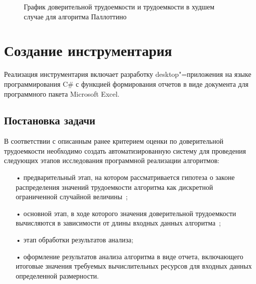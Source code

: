 \documentclass[a4paper, article, 14pt]{extarticle}
\begin{document}
\begin{figure}[h]
	\caption{График доверительной трудоемкости и трудоемкости в худшем случае для алгоритма Паллоттино}
	\label{fig:comparison_complexities}
\end{figure}

\section{Создание инструментария}\label{sec:analysis_system}

Реализация инструментария включает разработку desktop"=приложения на языке программирования C\# с функцией формирования отчетов в виде документа для программного пакета Microsoft Excel.

\subsection{Постановка задачи}\label{sec:technical_task}

В соответствии с описанным ранее критерием оценки по доверительной трудоемкости необходимо создать автоматизированную систему для проведения следующих этапов исследования программной реализации алгоритмов:

\begin{enumerate}
	\item[•] предварительный этап, на котором рассматривается гипотеза о законе распределения значений трудоемкости алгоритма как дискретной ограниченной случайной величины~\cite{petrushyn_ulyanov_planning};

	\item[•] основной этап, в ходе которого значения доверительной трудоемкости вычисляются в зависимости от длины входных данных алгоритма~\cite{petrushyn_ulyanov_analysis};

	\item[•] этап обработки результатов анализа;

	\item[•] оформление результатов анализа алгоритма в виде отчета, включающего итоговые значения требуемых вычислительных ресурсов для входных данных определенной размерности.
\end{enumerate}
\end{document}
